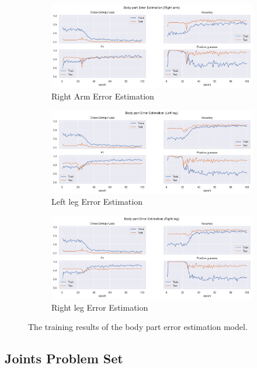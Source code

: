 \begin{figure}[ht]
  \begin{subfigure}[b]{0.9\linewidth}
      \centering
      \includegraphics[width=\textwidth]{figures/Results/v1_bs_60_is_64_e_100/bp/Right arm_ErrorEstimation.png}
      \caption{Right Arm Error Estimation}
      \label{fig:riar_lb_ee}
  \end{subfigure}
  \hfill
  \begin{subfigure}[b]{0.9\linewidth}
      \centering
      \includegraphics[width=\textwidth]{figures/Results/v1_bs_60_is_64_e_100/bp/Left leg_ErrorEstimation.png}
      \caption{Left leg Error Estimation}
      \label{fig:lele_lb_ee}
  \end{subfigure}
  \hfill
  \begin{subfigure}[b]{0.9\linewidth}
      \centering
      \includegraphics[width=\textwidth]{figures/Results/v1_bs_60_is_64_e_100/bp/Right leg_ErrorEstimation.png}
      \caption{Right leg Error Estimation}
      \label{fig:rileg_lb_ee}
  \end{subfigure}
  \hfill
  \caption[Limb model training results]{The training results of the body part error estimation model.}
  \label{fig:body part_training_results}
\end{figure}

\subsection{Joints Problem Set}


